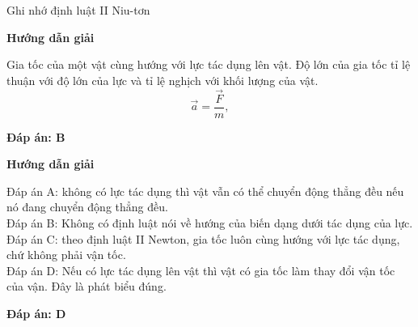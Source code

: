 \begin{dang}{Ghi nhớ định luật II Niu-tơn}
	{	\begin{center}
			\textbf{Hướng dẫn giải}
		\end{center}
		
		Gia tốc của một vật cùng hướng với lực tác dụng lên vật. Độ lớn của gia tốc tỉ lệ thuận với độ lớn của lực và tỉ lệ nghịch với khối lượng của vật.
		\begin{equation}
			\vec{a}=\dfrac{\vec F}{m},
		\end{equation}
		
		\textbf{Đáp án: B}
	}
	{	\begin{center}
			\textbf{Hướng dẫn giải}
		\end{center}
		
		Đáp án A: không có lực tác dụng thì vật vẫn có thể chuyển động thẳng đều nếu nó đang chuyển động thẳng đều. \\
		Đáp án B: Không có định luật nói về hướng của biến dạng dưới tác dụng của lực. \\
		Đáp án C: theo định luật II Newton, gia tốc luôn cùng hướng với lực tác dụng, chứ không phải vận tốc. \\
		Đáp án D: Nếu có lực tác dụng lên vật thì vật có gia tốc làm thay đổi vận tốc của vận. Đây là phát biểu đúng. 
		
		\textbf{Đáp án: D}
	}
\end{dang}
